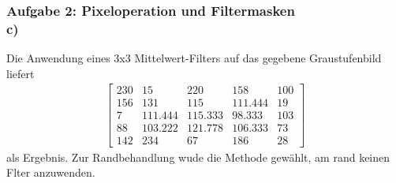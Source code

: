 \documentclass[accentcolor=tud9c,colorbacktitle,inverttitle,landscape,german,presentation,t]{tudbeamer}
\begin{document}
	\begin{frame}
		\frametitle{Aufgabe 2: Pixeloperation und Filtermasken \\ c)}
	
		Die Anwendung eines 3x3 Mittelwert-Filters auf das gegebene Graustufenbild liefert
		\begin{align*}
		\begin{bmatrix}
		230 & 15 & 220 & 158 & 100 \\
		156 & 131 & 115 & 111.444 & 19\\
		7 & 111.444 & 115.333 & 98.333 & 103\\
		88 & 103.222 & 121.778 & 106.333 & 73\\
		142 &234 & 67 & 186 & 28
		\end{bmatrix}
		\end{align*}
		als Ergebnis. Zur Randbehandlung wude die Methode gew\"ahlt, am rand keinen Flter anzuwenden.
	\end{frame}
\end{document}
